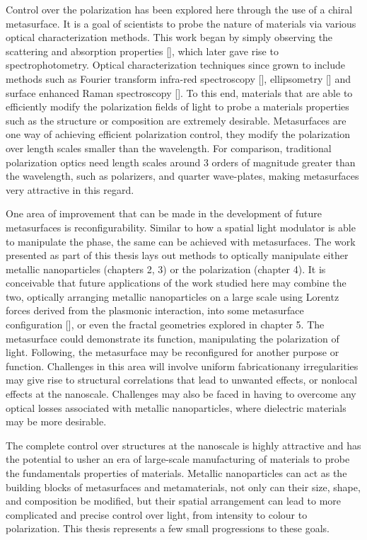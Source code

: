 Control over the polarization has been explored here through the use of a chiral metasurface. It is a goal of scientists to probe the nature of materials via various optical characterization methods. This work began by simply observing the scattering and absorption properties [\cite{Mie}], which later gave rise to spectrophotometry. Optical characterization techniques since grown to include methods such as Fourier transform infra-red spectroscopy [\cite{Chan:2016}], ellipsometry [\cite{Theeten:1981}] and surface enhanced Raman spectroscopy [\cite{Wang:2015}]. To this end, materials that are able to efficiently modify the polarization fields of light to probe a materials properties such as the structure or composition are extremely desirable. Metasurfaces are one way of achieving efficient polarization control, they modify the polarization over length scales smaller than the wavelength. For comparison, traditional polarization optics need length scales around 3 orders of magnitude greater than the wavelength, such as polarizers, and quarter wave-plates, making metasurfaces very attractive in this regard.

One area of improvement that can be made in the development of future metasurfaces is reconfigurability. Similar to how a spatial light modulator is able to manipulate the phase, the same can be achieved with metasurfaces. The work presented as part of this thesis lays out methods to optically manipulate either metallic nanoparticles (chapters 2, 3) or the polarization (chapter 4). It is conceivable that future applications of the work studied here may combine the two, optically arranging metallic nanoparticles on a large scale using Lorentz forces derived from the plasmonic interaction, into some metasurface configuration [\cite{Aieta}], or even the fractal geometries explored in chapter 5. The metasurface could demonstrate its function, manipulating the polarization of light. Following, the metasurface may be reconfigured for another purpose or function. Challenges in this area will involve uniform fabrication\textemdash any irregularities may give rise to structural correlations that lead to unwanted effects, or nonlocal effects at the nanoscale. Challenges may also be faced in having to overcome any optical losses associated with metallic nanoparticles, where dielectric materials may be more desirable.

The complete control over structures at the nanoscale is highly attractive and has the potential to usher an era of large-scale manufacturing of materials to probe the fundamentals properties of materials. Metallic nanoparticles can act as the building blocks of metasurfaces and metamaterials, not only can their size, shape, and composition be modified, but their spatial arrangement can lead to more complicated and precise control over light, from intensity to colour to polarization. This thesis represents a few small progressions to these goals.